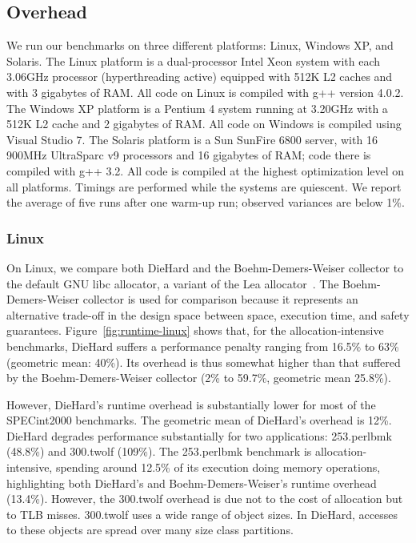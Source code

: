 \documentclass{sig-alternate}
\begin{document}


\subsection{Overhead}
\label{sec:empirical-results}

We run our benchmarks on three different platforms: Linux, Windows XP,
and Solaris. The Linux platform is a dual-processor Intel Xeon system
with each 3.06GHz processor (hyperthreading active) equipped with 512K
L2 caches and with 3 gigabytes of RAM. All code on Linux is compiled
with g++ version 4.0.2. The Windows XP platform is a Pentium 4 system
running at 3.20GHz with a 512K L2 cache and 2 gigabytes of RAM. All
code on Windows is compiled using Visual Studio 7. The Solaris
platform is a Sun SunFire 6800 server, with 16 900MHz UltraSparc v9
processors and 16 gigabytes of RAM; code there is compiled with g++
3.2. All code is compiled at the highest optimization level on all
platforms. Timings are performed while the systems are quiescent. We
report the average of five runs after one warm-up run; observed
variances are below 1\%.

\subsubsection{Linux}

\label{sec:linux-results}

\noindent
On Linux, we compare both DieHard and the Boehm-Demers-Weiser
collector to the default GNU libc allocator, a variant of the Lea
allocator~\cite{lea97}. The Boehm-Demers-Weiser collector is used for
comparison because it represents an alternative trade-off in the
design space between space, execution time, and safety guarantees.
Figure~\ref{fig:runtime-linux} shows that, for the
allocation-intensive benchmarks, DieHard suffers a performance penalty
ranging from 16.5\% to 63\% (geometric mean: 40\%). Its overhead is
thus somewhat higher than that suffered by the Boehm-Demers-Weiser collector
(2\% to 59.7\%, geometric mean 25.8\%).

However, DieHard's runtime overhead is substantially lower for most of
the SPECint2000 benchmarks. The geometric mean of DieHard's overhead
is 12\%. DieHard degrades performance substantially for two
applications: \textsf{253.perlbmk} (48.8\%) and \textsf{300.twolf}
(109\%). The \textsf{253.perlbmk} benchmark is allocation-intensive,
spending around 12.5\% of its execution doing memory operations,
highlighting both DieHard's and Boehm-Demers-Weiser's runtime overhead
(13.4\%). However, the \textsf{300.twolf} overhead is due not to the
cost of allocation but to TLB misses. \textsf{300.twolf} uses a wide
range of object sizes. In DieHard, accesses to these objects are
spread over many size class partitions.
\end{document}
